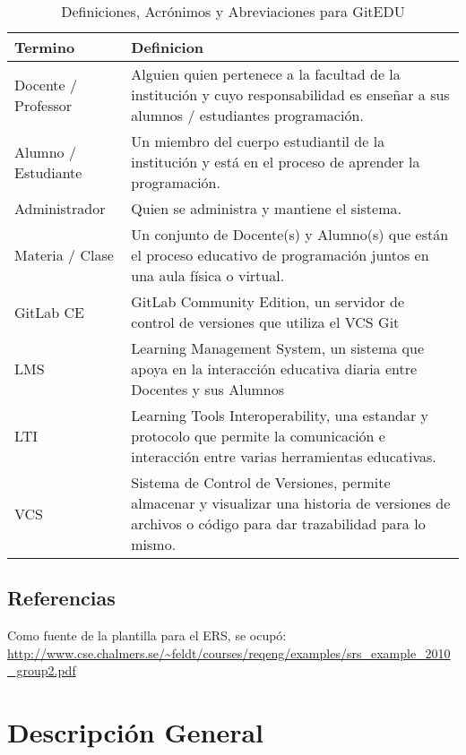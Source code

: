 \begin{table}[h!]
	\begin{tabular}{|p{}|p{}|}
    	\hline
    	\textbf{Termino} & \textbf{Definicion} \\
        \hline
		Docente / Professor & Alguien quien pertenece a la facultad de la institución y cuyo responsabilidad es enseñar a sus alumnos / estudiantes programación. \\
		\hline
		Alumno / Estudiante & Un miembro del cuerpo estudiantil de la institución y está en el proceso de aprender la programación. \\
		\hline
		Administrador & Quien se administra y mantiene el sistema. \\
		\hline
		Materia / Clase & Un conjunto de Docente(s) y Alumno(s) que están el proceso educativo de programación juntos en una aula física o virtual. \\
		\hline
		GitLab CE & GitLab Community Edition, un servidor de control de versiones que utiliza el VCS Git \\
		\hline
		LMS & Learning Management System, un sistema que apoya en la interacción educativa diaria entre Docentes y sus Alumnos \\
		\hline
		LTI & Learning Tools Interoperability, una estandar y protocolo que permite la comunicación e interacción entre varias herramientas educativas. \\
		\hline
		VCS & Sistema de Control de Versiones, permite almacenar y visualizar una historia de versiones de archivos o código para dar trazabilidad para lo mismo.  \\
		\hline
	\end{tabular}
    \caption{Definiciones, Acrónimos y Abreviaciones para GitEDU}
    \label{definiciones_ers}
\end{table}


\subsection{Referencias}
Como fuente de la plantilla para el ERS, se ocupó:
\url{http://www.cse.chalmers.se/~feldt/courses/reqeng/examples/srs_example_2010_group2.pdf}

\section{Descripción General}
